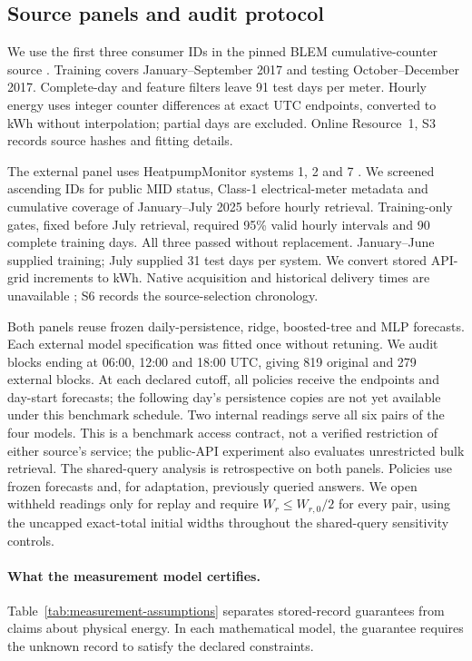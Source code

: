 \documentclass[12pt]{article}
\begin{document}
\FloatBarrier
\subsection{Source panels and audit protocol}
\label{sec:joint-protocol-summary}
We use the first three consumer IDs in the pinned BLEM cumulative-counter
source \citep{blem}. Training covers January--September
2017 and testing October--December 2017. Complete-day and feature filters
leave 91 test days per meter. Hourly energy uses integer counter differences
at exact UTC endpoints, converted to kWh without interpolation; partial days
are excluded. Online Resource~1, S3 records source hashes and fitting details.

The external panel uses HeatpumpMonitor systems 1, 2 and 7
\citep{hpmabout,hpmapi}. We screened ascending IDs for public MID
status, Class-1 electrical-meter metadata and cumulative coverage of
January--July 2025 before hourly retrieval. Training-only gates, fixed
before July retrieval, required 95\% valid hourly intervals
and 90 complete training days. All three passed without replacement.
January--June supplied training; July supplied 31 test days per system.
We convert stored API-grid increments to kWh. Native acquisition and
historical delivery times are unavailable \citep{hpmcode}; S6 records the
source-selection chronology.

Both panels reuse frozen daily-persistence, ridge, boosted-tree and MLP
forecasts. Each external model specification was fitted once without
retuning. We audit blocks ending at 06:00, 12:00 and 18:00 UTC, giving
819 original and 279 external blocks. At each declared cutoff, all policies
receive the endpoints and day-start forecasts; the following day's
persistence copies are not yet available under this benchmark schedule.
Two internal readings serve all six pairs of the four models. This is a
benchmark access contract, not a verified restriction of either source's service;
the public-API experiment also evaluates unrestricted bulk retrieval.
The shared-query analysis is retrospective on both panels. Policies use
frozen forecasts and, for adaptation, previously queried answers. We open
withheld readings only for replay and require $W_r\leq W_{r,0}/2$ for every pair, using the
uncapped exact-total initial widths throughout the shared-query sensitivity controls.
\paragraph{What the measurement model certifies.}
Table~\ref{tab:measurement-assumptions} separates stored-record guarantees
from claims about physical energy. In each mathematical model, the guarantee
requires the unknown record to satisfy the declared constraints.
\end{document}
